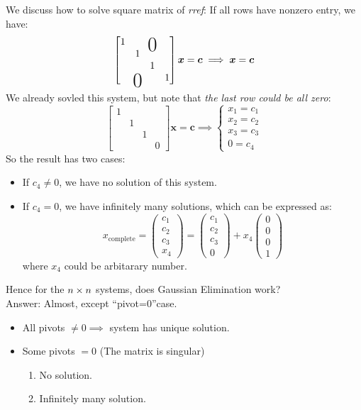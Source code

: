 \begin{example}
We discuss how to solve square matrix of \emph{rref}:
If all rows have nonzero entry, we have:
\[
\begin{bmatrix}
1&&\bigzero&\\
&1&&\\
&&1&\\
&\bigzero&&1
\end{bmatrix}\bm x = \bm c
\implies \bm x = \bm c
\]
We already sovled this system, but note that \textit{the last row could be all zero}:
\[
\begin{bmatrix}
1&&&\\
&1&&\\
&&1&\\
&&&0
\end{bmatrix}\bm x = \bm c\implies
\begin{cases}
x_1 = c_1\\
x_2 = c_2\\
x_3 = c_3\\
0 = c_4
\end{cases}
\]
\newpage
So the result has two cases:
\begin{itemize}
\item
If $c_4\ne0$, we have no solution of this system.
\item
If $c_4=0$, we have infinitely many solutions, which can be expressed as:
\[
x_{\text{complete}} = \begin{pmatrix}
c_1\\c_2\\c_3\\x_4
\end{pmatrix} = \begin{pmatrix}
c_1\\c_2\\c_3\\0
\end{pmatrix}+x_4\begin{pmatrix}
0\\0\\0\\1
\end{pmatrix}
\]
where $x_4$ could be arbitarary number.
\end{itemize}
Hence for the $n\times n$ systems, does Gaussian Elimination work?\\
Answer: Almost, except ``pivot=0''case.
\begin{itemize}
\item
All pivots $\ne0\implies$ system has unique solution.
\item
Some pivots $=0$ (The matrix is singular)
\begin{enumerate}
\item
No solution.
\item
Infinitely many solution.
\end{enumerate}
\end{itemize}
\end{example}
